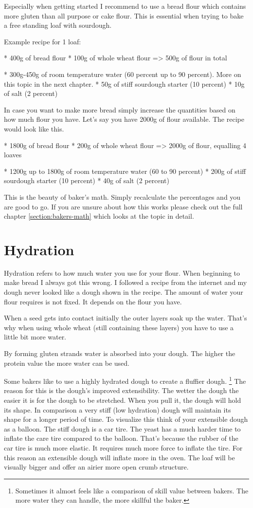 Especially when getting started I recommend to use a bread flour which
contains more gluten than all purpose or cake flour. This is essential
when trying to bake a free standing loaf with sourdough.

Example recipe for 1 loaf:

* 400g of bread flour
* 100g of whole wheat flour
=> 500g of flour in total

* 300g-450g of room temperature water (60 percent up to 90 percent). More on
this topic in the next chapter.
* 50g of stiff sourdough starter (10 percent)
* 10g of salt (2 percent)

In case you want to make more bread simply increase the quantities based on
how much flour you have. Let's say you have 2000g of flour available. The
recipe would look like this.

* 1800g of bread flour
* 200g of whole wheat flour
=> 2000g of flour, equalling 4 loaves

* 1200g up to 1800g of room temperature water (60 to 90 percent)
* 200g of stiff sourdough starter (10 percent)
* 40g of salt (2 percent)

This is the beauty of baker's math. Simply recalculate the percentages and you
are good to go. If you are unsure about how this works please check out the
full chapter \ref{section:bakers-math} which looks at the topic in detail.


\section{Hydration}

Hydration refers to how much water you use for your flour. When
beginning to make bread I always got this wrong. I followed a recipe from the
internet and my dough never looked like a dough shown in the recipe.
The amount of water your flour requires is not fixed. It depends on the flour
you have.

When a seed gets into contact initially the outer layers soak up the water.
That's why when using whole wheat (still containing these layers) you have to
use a little bit more water.

By forming gluten strands water is absorbed into your dough. The higher the
protein value the more water can be used.

Some bakers like to use a highly hydrated dough to create a fluffier dough.
\footnote{Sometimes it almost feels like a comparison of skill value between bakers. The
more water they can handle, the more skillful the baker.} The reason for this
is the dough's improved extensibility. The wetter the dough the easier it is
for the dough to be stretched. When you pull it, the dough will hold its
shape. In comparison a very stiff (low hydration) dough will maintain its
shape for a longer period of time. To visualize this think of your extensible
dough as a balloon. The stiff dough is a car tire. The yeast has a much harder
time to inflate the care tire compared to the balloon. That's because the
rubber of the car tire is much more elastic. It requires much more force to
inflate the tire. For this reason an extensible dough will inflate more in the
oven. The loaf will be visually bigger and offer an airier more open crumb structure.


